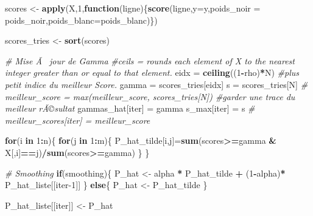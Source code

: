 \documentclass[]{article}
\newenvironment{Shaded}{\begin{snugshade}}{\end{snugshade}}
\newcommand{\CommentTok}[1]{\textcolor[rgb]{0.56,0.35,0.01}{\textit{#1}}}
\newcommand{\ControlFlowTok}[1]{\textcolor[rgb]{0.13,0.29,0.53}{\textbf{#1}}}
\newcommand{\DataTypeTok}[1]{\textcolor[rgb]{0.13,0.29,0.53}{#1}}
\newcommand{\DecValTok}[1]{\textcolor[rgb]{0.00,0.00,0.81}{#1}}
\newcommand{\KeywordTok}[1]{\textcolor[rgb]{0.13,0.29,0.53}{\textbf{#1}}}
\newcommand{\NormalTok}[1]{#1}
\newcommand{\OperatorTok}[1]{\textcolor[rgb]{0.81,0.36,0.00}{\textbf{#1}}}
\newcommand{\StringTok}[1]{\textcolor[rgb]{0.31,0.60,0.02}{#1}}
\begin{document}
\begin{Shaded}
\begin{Highlighting}[]
\NormalTok{      scores <-}\StringTok{ }\KeywordTok{apply}\NormalTok{(X,}\DecValTok{1}\NormalTok{,}\ControlFlowTok{function}\NormalTok{(ligne)\{}\KeywordTok{score}\NormalTok{(ligne,}\DataTypeTok{y=}\NormalTok{y,}\DataTypeTok{poids_noir =}\NormalTok{ poids_noir,}\DataTypeTok{poids_blanc=}\NormalTok{poids_blanc)\})}
      
\NormalTok{      scores_tries <-}\StringTok{ }\KeywordTok{sort}\NormalTok{(scores)}
      
      \CommentTok{# Mise Ã  jour de Gamma }
      \CommentTok{#ceils = rounds each element of X to the nearest integer greater than or equal to that element.}
\NormalTok{      eidx =}\StringTok{ }\KeywordTok{ceiling}\NormalTok{((}\DecValTok{1}\OperatorTok{-}\NormalTok{rho)}\OperatorTok{*}\NormalTok{N) }\CommentTok{#plus petit indice du meilleur Score.}
\NormalTok{      gamma =}\StringTok{ }\NormalTok{scores_tries[eidx]}
\NormalTok{      s =}\StringTok{ }\NormalTok{scores_tries[N]}
      \CommentTok{#  meilleur_score = max(meilleur_score,  scores_tries[N]) #garder une trace du meilleur rÃ©sultat}
\NormalTok{      gammas_hat[iter] =}\StringTok{ }\NormalTok{gamma}
\NormalTok{      s_max[iter] =}\StringTok{ }\NormalTok{s}
      \CommentTok{# meilleur_scores[iter] = meilleur_score}
      
      
      \ControlFlowTok{for}\NormalTok{(i }\ControlFlowTok{in} \DecValTok{1}\OperatorTok{:}\NormalTok{n)\{}
        \ControlFlowTok{for}\NormalTok{(j }\ControlFlowTok{in} \DecValTok{1}\OperatorTok{:}\NormalTok{m)\{}
\NormalTok{          P_hat_tilde[i,j]=}\KeywordTok{sum}\NormalTok{(scores}\OperatorTok{>=}\NormalTok{gamma }\OperatorTok{&}\StringTok{ }\NormalTok{X[,i]}\OperatorTok{==}\NormalTok{j)}\OperatorTok{/}\KeywordTok{sum}\NormalTok{(scores}\OperatorTok{>=}\NormalTok{gamma)}
\NormalTok{        \}}
\NormalTok{      \}}
      
      \CommentTok{# Smoothing}
      \ControlFlowTok{if}\NormalTok{(smoothing)\{}
\NormalTok{        P_hat <-}\StringTok{ }\NormalTok{alpha }\OperatorTok{*}\StringTok{ }\NormalTok{P_hat_tilde }\OperatorTok{+}\StringTok{ }\NormalTok{(}\DecValTok{1}\OperatorTok{-}\NormalTok{alpha)}\OperatorTok{*}\StringTok{ }\NormalTok{P_hat_liste[[iter}\DecValTok{-1}\NormalTok{]]}
\NormalTok{      \} }\ControlFlowTok{else}\NormalTok{\{}
\NormalTok{        P_hat <-}\StringTok{ }\NormalTok{P_hat_tilde}
\NormalTok{      \}}
      
\NormalTok{      P_hat_liste[[iter]] <-}\StringTok{ }\NormalTok{P_hat}
      

\end{Highlighting}
\end{Shaded}
\end{document}
